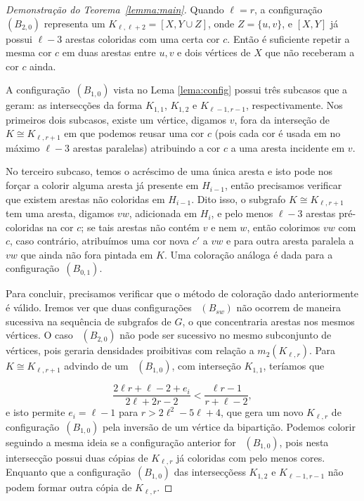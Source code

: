 \documentclass[12pt,a4paper]{book}
\newcommand{\K}{K_{\ell,r}} %
\begin{document}
\begin{proof}[Demonstração do Teorema~\ref{lemma:main}]
        Quando $\ell = r$, a configuração~\hyperref[configB]{$(B_{2,0})$} representa um 
        $K_{\ell, \ell+2} = [X, Y \cup Z]$, onde $Z = \{u,v\}$, e $[X,Y]$ já possui $\ell-3$ arestas coloridas com uma certa cor $c$. 
        Então é suficiente repetir a mesma cor $c$ em duas arestas entre $u,v$ e dois vértices de $X$ que não receberam a cor $c$ ainda.
        
       A configuração~\hyperref[configB]{$(B_{1,0})$} vista no Lema \ref{lema:config} possui três subcasos que a geram: 
       as intersecções da forma $K_{1,1}$, $K_{1,2}$ e $K_{\ell-1,r-1}$, respectivamente. 
       Nos primeiros dois subcasos, existe um vértice, digamos $v$,
        fora da interseção de $K \cong K_{\ell,r+1}$ em que podemos reusar uma
        cor $c$ (pois cada cor é usada em no máximo $\ell-3$ arestas paralelas) atribuindo a cor $c$ a uma aresta incidente em $v$.
                
        No terceiro subcaso, temos o acréscimo de uma única aresta e isto pode nos forçar a colorir alguma aresta já presente em $H_{i-1}$, então precisamos verificar que existem arestas não coloridas em $H_{i-1}$. 
        Dito isso, o subgrafo $K \cong K_{\ell,r+1}$ tem uma aresta, digamos $vw$, adicionada em $H_i$, e pelo menos $\ell-3$ arestas pré-coloridas na cor $c$;
        se tais arestas não contém $v$ e nem $w$, então colorimos $vw$ com $c$, caso contrário, atribuímos uma cor nova $c'$ a $vw$ e para outra aresta paralela a $vw$ que ainda não fora pintada em $K$.  
        Uma coloração análoga é dada para a configuração~\hyperref[configB]{$(B_{0,1})$}.
        
        Para concluir, precisamos verificar que o método de coloração dado anteriormente é válido.
        Iremos ver que duas configurações ~\hyperref[configB]{$(B_{sw})$} não ocorrem de maneira sucessiva na sequência de subgrafos  de $G$, o que concentraria arestas nos mesmos vértices. %
        O caso ~\hyperref[configB]{$(B_{2,0})$} não pode ser sucessivo no mesmo subconjunto de vértices, pois geraria densidades proibitivas com relação a $m_2(\K)$.
        Para $K \cong K_{\ell,r+1}$ advindo de um ~\hyperref[configB]{$(B_{1,0})$}, com interseção $K_{1,1}$, teríamos que 
        
        \[
            \frac{2\ell r+\ell-2+e_i}{2\ell+2r-2} < \frac{\ell
r-1}{r+\ell-2},
        \]
        e isto permite $e_i = \ell-1$ para $r > 2\ell^2-5\ell+4$,
        que gera um novo $\K$ de configuração~\hyperref[configB]{$(B_{1,0})$} pela inversão de um vértice da bipartição.
         Podemos colorir seguindo a mesma ideia se a configuração anterior for ~\hyperref[configB]{$(B_{1,0})$}, pois nesta intersecção possui duas cópias de $\K$ já coloridas com pelo menos cores.
        Enquanto que a configuração~\hyperref[configB]{$(B_{1,0})$}
 das intersecçõess $K_{1,2}$ e $K_{\ell-1,r-1}$ não podem formar outra cópia de $\K$.  


\end{proof}
\end{document}
